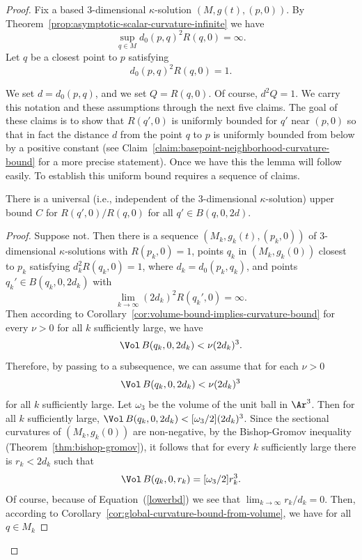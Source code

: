 \begin{proof}
Fix a based $3$-dimensional $\kappa$-solution $(M,g(t),(p,0))$. By
Theorem~\ref{prop:asymptotic-scalar-curvature-infinite} we have
$$\sup_{q\in M}d_{0}(p,q)^2R(q,0)=\infty.$$
Let $q$ be a closest point to $p$ satisfying
$$d_0(p,q)^2R(q,0)=1.$$

We set $d=d_{0}(p,q)$, and we set $Q=R(q,0)$. Of course, $d^2Q=1$.
We carry this notation and these assumptions through the next five
claims. The goal of these claims is to show that $R(q',0)$ is
uniformly bounded for $q'$ near $(p,0)$ so that in fact the distance
$d$ from the point $q$ to $p$ is uniformly bounded from below by a
positive constant (see Claim~\ref{claim:basepoint-neighborhood-curvature-bound} for a more precise
statement). Once we have this the lemma will follow easily. To
establish this uniform bound requires a sequence of claims.





\begin{claim}\label{claim:curvature-ratio-bound-near-basepoint}
\label{2Rbound}
There is a universal (i.e., independent of the $3$-dimensional
$\kappa$-solution) upper bound $C$ for $R(q',0)/R(q,0)$ for all
$q'\in B(q,0,2d)$.
\end{claim}

\begin{proof}
Suppose not. Then there is a sequence $(M_k,g_k(t),(p_k,0))$ of
$3$-dimensional $\kappa$-solutions with $R(p_k,0)=1$, points $q_k$
in $(M_k,g_k(0))$ closest to $p_k$ satisfying $d_k^2R(q_k,0)=1$,
where $d_k=d_0(p_k,q_k)$, and points $q_k'\in B(q_k,0,2d_k)$ with
$$\lim_{k\rightarrow\infty}(2d_k)^2R(q_k',0)=\infty.$$ Then according
to Corollary~\ref{cor:volume-bound-implies-curvature-bound} for every $\nu>0$ for all $k$
sufficiently large, we have \begin{equation}\label{V3}
\Vol\,B(q_k,0,2d_k)<\nu (2d_k)^3.\end{equation} Therefore, by
passing to a subsequence, we can assume that for each $\nu>0$
\begin{equation}\label{lowerbd}
\Vol\,B(q_k,0,2d_k)< \nu (2d_k)^3 \end{equation} for all $k$
sufficiently large. Let $\omega_3$ be the volume of the unit ball in
$\Ar^3$. Then for all $k$ sufficiently large, $\Vol\,B(q_k,0,2d_k)<[\omega_3/2](2d_k)^3$. Since the sectional
curvatures of $(M_k,g_k(0))$ are non-negative, by the Bishop-Gromov
inequality (Theorem~\ref{thm:bishop-gromov}),  it follows that for every
$k$ sufficiently large there is $r_k<2d_k$ such that
\begin{equation}\label{V/2}
\Vol\,B(q_k,0,r_k)=[\omega_3/2]r_k^3.\end{equation} Of course,
because of Equation~(\ref{lowerbd}) we see that $\lim_{k\rightarrow\infty}r_k/d_k=0$. Then, according to
Corollary~\ref{cor:global-curvature-bound-from-volume}, we have for all $q\in M_k$


\end{proof}
\end{proof}

